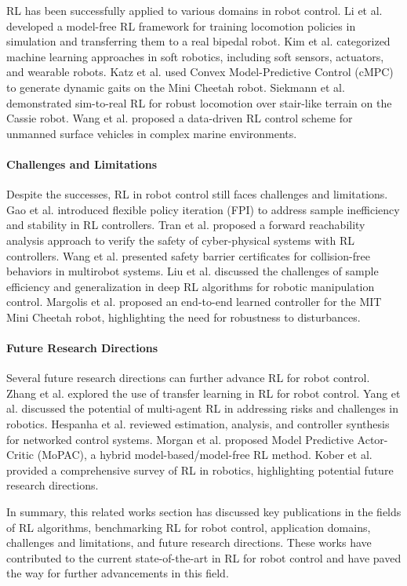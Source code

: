 RL has been successfully applied to various domains in robot control. Li et al. \citep{li2021reinforcement} developed a model-free RL framework for training locomotion policies in simulation and transferring them to a real bipedal robot. Kim et al. \citep{kim2021review} categorized machine learning approaches in soft robotics, including soft sensors, actuators, and wearable robots. Katz et al. \citep{katz2019mini} used Convex Model-Predictive Control (cMPC) to generate dynamic gaits on the Mini Cheetah robot. Siekmann et al. \citep{siekmann2021blind} demonstrated sim-to-real RL for robust locomotion over stair-like terrain on the Cassie robot. Wang et al. \citep{wang2021data} proposed a data-driven RL control scheme for unmanned surface vehicles in complex marine environments.

\paragraph{Challenges and Limitations}

Despite the successes, RL in robot control still faces challenges and limitations. Gao et al. \citep{gao2020reinforcement} introduced flexible policy iteration (FPI) to address sample inefficiency and stability in RL controllers. Tran et al. \citep{tran2019safety} proposed a forward reachability analysis approach to verify the safety of cyber-physical systems with RL controllers. Wang et al. \citep{wang2017safety} presented safety barrier certificates for collision-free behaviors in multirobot systems. Liu et al. \citep{liu2021deep} discussed the challenges of sample efficiency and generalization in deep RL algorithms for robotic manipulation control. Margolis et al. \citep{margolis2022rapid} proposed an end-to-end learned controller for the MIT Mini Cheetah robot, highlighting the need for robustness to disturbances.

\paragraph{Future Research Directions}

Several future research directions can further advance RL for robot control. Zhang et al. \citep{zhang2021learning} explored the use of transfer learning in RL for robot control. Yang et al. \citep{yang2020combating} discussed the potential of multi-agent RL in addressing risks and challenges in robotics. Hespanha et al. \citep{hespanha2007a} reviewed estimation, analysis, and controller synthesis for networked control systems. Morgan et al. \citep{morgan2021model} proposed Model Predictive Actor-Critic (MoPAC), a hybrid model-based/model-free RL method. Kober et al. \citep{kober2013reinforcement} provided a comprehensive survey of RL in robotics, highlighting potential future research directions.

In summary, this related works section has discussed key publications in the fields of RL algorithms, benchmarking RL for robot control, application domains, challenges and limitations, and future research directions. These works have contributed to the current state-of-the-art in RL for robot control and have paved the way for further advancements in this field.
